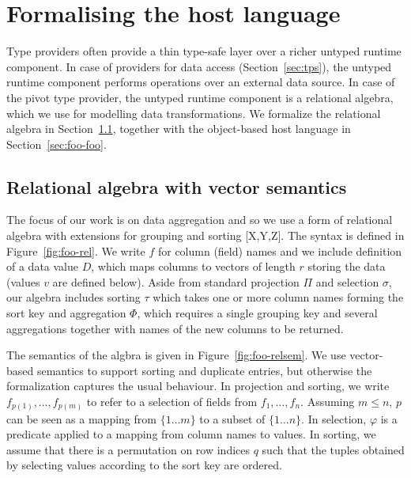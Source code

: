 \documentclass[a4paper,UKenglish]{lipics-v2016}
\theoremstyle{plain}
\theoremstyle{definition}
\begin{document}

\section{Formalising the host language}
\label{sec:foo}

Type providers often provide a thin type-safe layer over a richer untyped runtime component. In case 
of providers for data access (Section~\ref{sec:tps}), the untyped runtime component performs operations
over an external data source. In case of the pivot type provider, the untyped runtime component 
is a relational algebra, which we use for modelling data transformations. We formalize the 
relational algebra in Section~\ref{sec:foo-rel}, together with the object-based host language
in Section~\ref{sec:foo-foo}.

\subsection{Relational algebra with vector semantics}
\label{sec:foo-rel}

The focus of our work is on data aggregation and so we use a form of relational algebra with 
extensions for grouping and sorting [X,Y,Z]. The syntax is defined in Figure~\ref{fig:foo-rel}.
We write $f$ for column (field) names and we include definition of a data value $D$, which maps
columns to vectors of length $r$ storing the data (values $v$ are defined below).
Aside from standard projection $\Pi$ and selection $\sigma$, our algebra includes sorting 
$\tau$ which takes one or more column names forming the sort key and aggregation $\Phi$, which
requires a single grouping key and several aggregations together with names of the
new columns to be returned.

The semantics of the algbra is given in Figure~\ref{fig:foo-relsem}. We use vector-based semantics
to support sorting and duplicate entries, but otherwise the formalization captures the usual
behaviour. In projection and sorting, we write $f_{p(1)}, \ldots, f_{p(m)}$ to refer to a selection
of fields from $f_1, \ldots, f_n$. Assuming $m\leq n$, $p$ can be seen as a mapping from $\{1\ldots m\}$
to a subset of $\{1\ldots n\}$. In selection, $\varphi$ is a predicate applied to a mapping from 
column names to values. In sorting, we assume that there is a permutation on row indices $q$ such
that the tuples obtained by selecting values according to the sort key are ordered.
\end{document}
